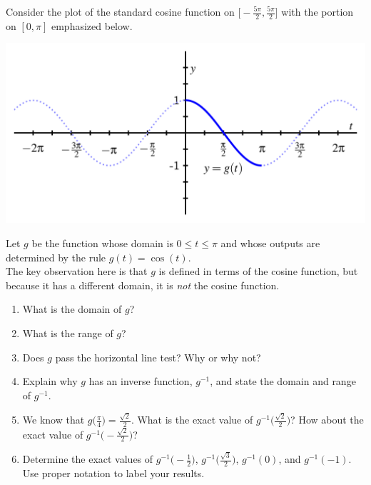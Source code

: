 \documentclass{ximera}
\begin{document}
Consider the plot of the standard cosine function on $\Big[-\frac{5\pi}{2},\frac{5\pi}{2}\Big]$ with the portion on $[0,\pi]$ emphasized below.%

\begin{image}
\includegraphics{inverse-trig-PA-cosine.png}
\end{image}

\begin{exploration}
Let $g$ be the function whose domain is $0 \leq t \leq \pi$ and whose outputs are determined by the rule $g(t) = \cos(t)$.  \\
The key observation here is that $g$ is defined in terms of the cosine function, but because it has a different domain, it is \emph{not} the cosine function.%
\par

\begin{enumerate}[label=\alph*.]
\item
What is the domain of $g$?%
\item
What is the range of $g$?%
\item
Does $g$ pass the horizontal line test? Why or why not?%
\item
Explain why $g$ has an inverse function, $g^{-1}$, and state the domain and range of $g^{-1}$.%
\item
We know that $g\Big(\frac{\pi}{4}\Big) = \frac{\sqrt{2}}{2}$. What is the exact value of $g^{-1}\bigg(\frac{\sqrt{2}}{2}\bigg)$? How about the exact value of $g^{-1}\bigg(-\frac{\sqrt{2}}{2}\bigg)$?%
\item
Determine the exact values of $g^{-1}\Big(-\frac{1}{2}\Big)$, $g^{-1}\bigg(\frac{\sqrt{3}}{2}\bigg)$, $g^{-1}(0)$, and $g^{-1}(-1)$. Use proper notation to label your results.%
\end{enumerate}
\end{exploration}

\end{document}
